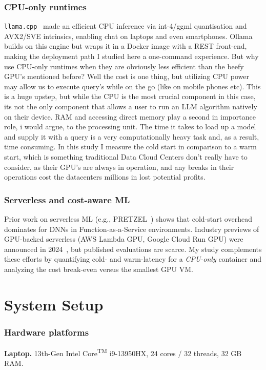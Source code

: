 \documentclass[conference]{IEEEtran}
\begin{document}
\subsubsection*{CPU-only runtimes}
\texttt{llama.cpp}~\cite{llamacpp} made an efficient CPU inference via int-4/ggml quantisation and AVX2/SVE intrinsics, enabling chat on laptops and even smartphones.
Ollama builds on this engine but wraps it in a Docker image with a REST front-end, making the deployment path I studied here a one-command experience. But why use CPU-only runtimes when they are obviously less efficient than the beefy GPU's mentioned before? Well the cost is one thing, but utilizing CPU power may allow us to execute query's while on the go (like on mobile phones etc). This is a huge upstep, but while the CPU is the most crucial component in this case, its not the only component that allows a user to run an LLM algorithm natively on their device. RAM and accessing direct memory play a second in importance role, i would argue, to the processing unit. The time it takes to load up a model and supply it with a query is a very computationally heavy task and, as a result, time consuming. In this study I measure the cold start in comparison to a warm start, which is something traditional Data Cloud Centers don't really have to consider, as their GPU's are always in operation, and any breaks in their operations cost the datacenters millions in lost potential profits.

\subsubsection*{Serverless and cost-aware ML}
Prior work on serverless ML (e.g., PRETZEL~\cite{pretzel}) shows that cold-start overhead dominates for DNNs in Function-as-a-Service environments.
Industry previews of GPU-backed serverless (AWS Lambda GPU, Google Cloud Run GPU) were announced in 2024~\cite{serverlessgpu}, but published evaluations are scarce.
My study complements these efforts by quantifying cold- and warm-latency for a \emph{CPU-only} container and analyzing the cost break-even versus the smallest GPU VM.
\section{System Setup}\label{sec:setup}

\subsubsection*{Hardware platforms}
\textbf{Laptop.} 13th-Gen Intel\textsuperscript{\textregistered} Core\textsuperscript{TM} i9-13950HX,  
24 cores / 32 threads, 32 GB RAM.
\end{document}
